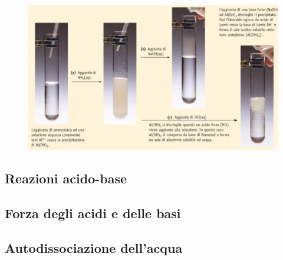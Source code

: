 \vspace{0.2cm}

\vspace{0.2cm}

\begin{figure}[htp]
    \centering
    \includegraphics[width=12cm]{immagini/anfoliti.png}
\end{figure}

\subsection{Reazioni acido-base}
\subsection{Forza degli acidi e delle basi}
\subsection{Autodissociazione dell'acqua}